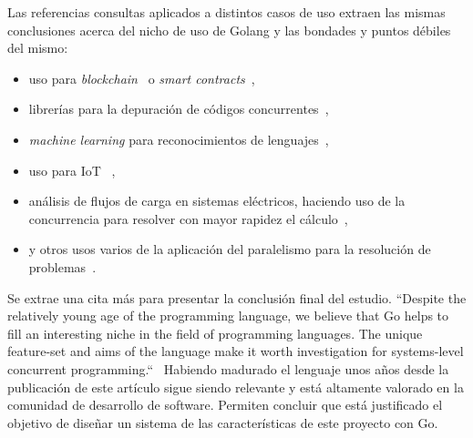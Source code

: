 Las referencias consultas aplicados a distintos casos de uso extraen las mismas conclusiones acerca del nicho de uso de Golang y las bondades y puntos débiles del mismo:

\begin{itemize}
	\item uso para \textit{blockchain}~\cite{Ray202110857} o \textit{smart contracts}~\cite{Ding2021321},
	\item librerías para la depuración de códigos concurrentes~\cite{Taheri2021138},
	\item \textit{machine learning} para reconocimientos de lenguajes~\cite{NoAuthor2021179,Dilley2019377},
	\item uso para IoT ~\cite{Samaniego2017116},
	\item análisis de flujos de carga en sistemas eléctricos, haciendo uso de la concurrencia para resolver con mayor rapidez el cálculo~\cite{Khaitan20152909},
	\item y otros usos varios de la aplicación del paralelismo para la resolución de problemas~\cite{Qiu2018,Shoumik20181,Mladenovic2018,Benedict2017437,Irawan2017,Leokhin2015656,Komendantskaya2014121,Mittal2014292}.
\end{itemize}

Se extrae una cita más para presentar la conclusión final del estudio.
“Despite the relatively young age of the programming language, we believe that Go helps to fill an interesting niche in the field of programming languages.
The unique feature-set and aims of the language make it worth investigation for systems-level concurrent programming.“~\cite{WhiteheadII2011209}
Habiendo madurado el lenguaje unos años desde la publicación de este artículo sigue siendo relevante y está altamente valorado en la comunidad de desarrollo de software.
Permiten concluir que está justificado el objetivo de diseñar un sistema de las características de este proyecto con Go.

